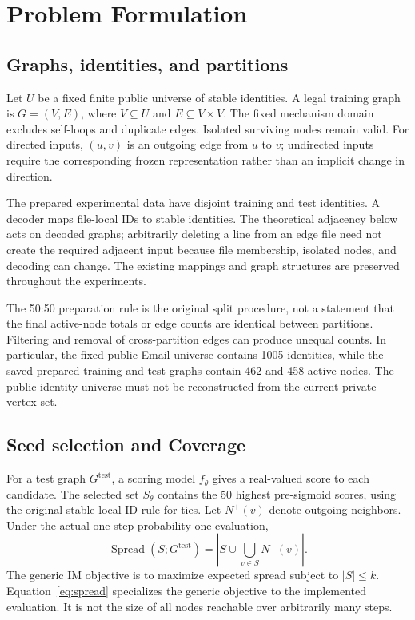 \chapter{Problem Formulation}\label{ch:problem}
\section{Graphs, identities, and partitions}
Let $U$ be a fixed finite public universe of stable identities. A legal training graph is $G=(V,E)$, where $V\subseteq U$ and $E\subseteq V\times V$. The fixed mechanism domain excludes self-loops and duplicate edges. Isolated surviving nodes remain valid. For directed inputs, $(u,v)$ is an outgoing edge from $u$ to $v$; undirected inputs require the corresponding frozen representation rather than an implicit change in direction.

The prepared experimental data have disjoint training and test identities. A decoder maps file-local IDs to stable identities. The theoretical adjacency below acts on decoded graphs; arbitrarily deleting a line from an edge file need not create the required adjacent input because file membership, isolated nodes, and decoding can change. The existing mappings and graph structures are preserved throughout the experiments.

The 50:50 preparation rule is the original split procedure, not a statement that the final active-node totals or edge counts are identical between partitions. Filtering and removal of cross-partition edges can produce unequal counts. In particular, the fixed public Email universe contains 1005 identities, while the saved prepared training and test graphs contain 462 and 458 active nodes. The public identity universe must not be reconstructed from the current private vertex set.

\section{Seed selection and Coverage}
For a test graph $G^{\mathrm{test}}$, a scoring model $f_\theta$ gives a real-valued score to each candidate. The selected set $S_\theta$ contains the 50 highest pre-sigmoid scores, using the original stable local-ID rule for ties. Let $N^+(v)$ denote outgoing neighbors. Under the actual one-step probability-one evaluation,
\begin{equation}
 \operatorname{Spread}(S;G^{\mathrm{test}})
 =\left|S\cup\bigcup_{v\in S}N^+(v)\right|.\label{eq:spread}
\end{equation}
The generic IM objective is to maximize expected spread subject to $|S|\leq k$. Equation~\eqref{eq:spread} specializes the generic objective to the implemented evaluation. It is not the size of all nodes reachable over arbitrarily many steps.

